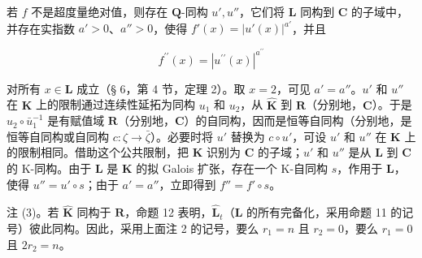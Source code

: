 若 \(f\) 不是超度量绝对值，则存在 \(\mathbf{Q}\)-同构 \(u', u''\)，它们将 \(\mathbf{L}\) 同构到 \(\mathbf{C}\) 的子域中，并存在实指数 \(a' > 0\)、\(a'' > 0\)，使得 \(f'(x) = |u'(x)|^{a'}\)，并且

\[
f ^ {\prime \prime} (x) = | u ^ {\prime \prime} (x) | ^ {a ^ {\prime \prime}}
\]

对所有 \(x \in \mathbf{L}\) 成立（§ 6，第 4 节，定理 2）。取 \(x = 2\)，可见 \(a' = a''\)。\(u'\) 和 \(u''\) 在 \(\mathbf{K}\) 上的限制通过连续性延拓为同构 \(u_1\) 和 \(u_2\)，从 \(\hat{\mathbf{K}}\) 到 \(\mathbf{R}\)（分别地，\(\mathbf{C}\)）。于是 \(u_2 \circ \bar{u}_1^{-1}\) 是有赋值域 \(\mathbf{R}\)（分别地，\(\mathbf{C}\)）的自同构，因而是恒等自同构（分别地，是恒等自同构或自同构 \(c: \zeta \to \bar{\zeta}\)）。必要时将 \(u'\) 替换为 \(c \circ u'\)，可设 \(u'\) 和 \(u''\) 在 \(\mathbf{K}\) 上的限制相同。借助这个公共限制，把 \(\mathbf{K}\) 识别为 \(\mathbf{C}\) 的子域；\(u'\) 和 \(u''\) 是从 \(\mathbf{L}\) 到 \(\mathbf{C}\) 的 K-同构。由于 \(\mathbf{L}\) 是 \(\mathbf{K}\) 的拟 Galois 扩张，存在一个 K-自同构 \(s\)，作用于 \(\mathbf{L}\)，使得 \(u'' = u' \circ s\)；由于 \(a' = a''\)，立即得到 \(f'' = f' \circ s\)。

注 (3)。若 \(\hat{\mathbf{K}}\) 同构于 \(\mathbf{R}\)，命题 12 表明，\(\hat{\mathbf{L}}_t\)（\(\mathbf{L}\) 的所有完备化，采用命题 11 的记号）彼此同构。因此，采用上面注 2 的记号，要么 \(r_1 = n\) 且 \(r_2 = 0\)，要么 \(r_1 = 0\) 且 \(2r_2 = n\)。

